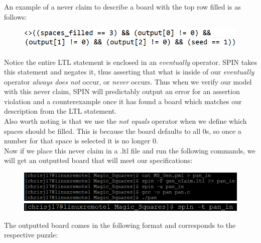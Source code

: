 \documentclass[a4paper]{article}
\begin{document}
An example of a never claim to describe a board with the top row filled is as follows:

\begin{figure} [h]
\centering
\includegraphics{never_claim}
\end{figure}

Notice the entire LTL statement is enclosed in an {\it eventually} operator. SPIN takes this statement and negates it, thus asserting that what is inside of our {\it eventually} operator {\it always does not} occur, or {\it never} occurs. Thus when we verify our model with this never claim, SPIN will predictably output an error for an assertion violation and a counterexample once it has found a board which matches our description from the LTL statement. \\

Also worth noting is that we use the {\it not equals} operator when we define which spaces should be filled. This is because the board defaults to all 0s, so once a number for that space is selected it is no longer 0. \\

Now if we place this never claim in a .ltl file and run the following commands, we will get an outputted board that will meet our specifications: 

\begin{figure} [h]
\centering
\includegraphics{commands_1}
\includegraphics{commands_2}
\end{figure}

The outputted board comes in the following format and corresponds to the respective puzzle:
\end{document}
